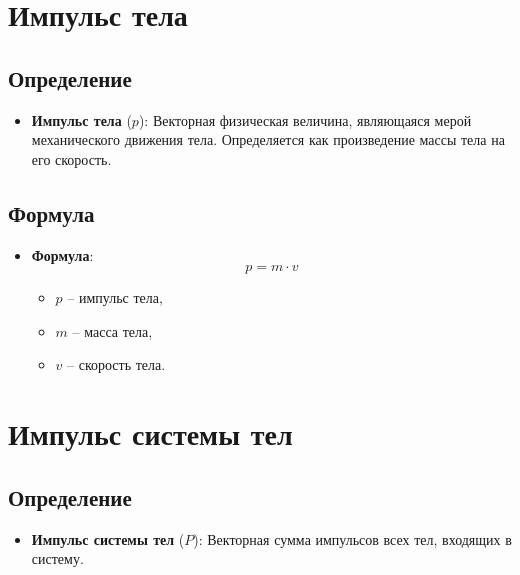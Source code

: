 \documentclass[a4paper,12pt]{article}
\begin{document}
\begin{center}
\end{center}

\vspace{-2.5em}

\section*{Импульс тела}

\vspace{-9pt}
\subsection*{Определение}
\vspace{-3pt}
\begin{itemize}[itemsep=0pt, topsep=0pt, parsep=3pt]
  \item \textbf{Импульс тела} ($p$): Векторная физическая величина, являющаяся мерой механического движения тела. Определяется как произведение массы тела на его скорость.
\end{itemize}

\vspace{-9pt}
\subsection*{Формула}
\vspace{-3pt}
\begin{itemize}[itemsep=0pt, topsep=0pt, parsep=3pt]
  \item \textbf{Формула}: \[ p = m \cdot v \]
    \begin{itemize}[itemsep=0pt, topsep=0pt, parsep=3pt]
      \item $p$ – импульс тела,
      \item $m$ – масса тела,
      \item $v$ – скорость тела.
    \end{itemize}
\end{itemize}



\section*{Импульс системы тел}

\vspace{-9pt}
\subsection*{Определение}
\vspace{-3pt}
\begin{itemize}[itemsep=0pt, topsep=0pt, parsep=3pt]
  \item \textbf{Импульс системы тел} ($P$): Векторная сумма импульсов всех тел, входящих в систему.
\end{itemize}
\end{document}
